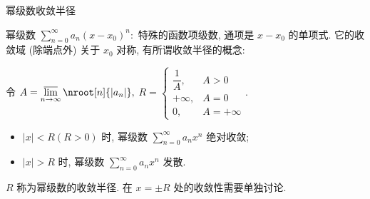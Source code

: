 
\begin{frame}{幂级数收敛半径}

幂级数 $\sum\limits_{n=0}^\infty a_n (x-x_0)^n:$ 特殊的函数项级数, 通项是 $x-x_0$ 的单项式. 它的收敛域 (除端点外) 关于 $x_0$ 对称, 有所谓\alert{收敛半径}的概念:

\pause

\begin{thm}
令 $A = \varlimsup\limits_{n\to\infty} \nroot[n]{\lvert a_n \rvert},$ $R = \begin{cases} \dfrac{1}{A}, & A > 0 \\ +\infty, & A = 0 \\ 0, & A = +\infty \end{cases}.$
\begin{itemize}
\item $\lvert x \rvert < R (R > 0)$ 时, 幂级数 $\sum\limits_{n=0}^\infty a_n x^n$ 绝对收敛;
\item $\lvert x \rvert > R$ 时, 幂级数 $\sum\limits_{n=0}^\infty a_n x^n$ 发散.
\end{itemize}
\end{thm}

\pause

$R$ 称为幂级数的收敛半径. 在 $x = \pm R$ 处的收敛性需要单独讨论.

\end{frame}


